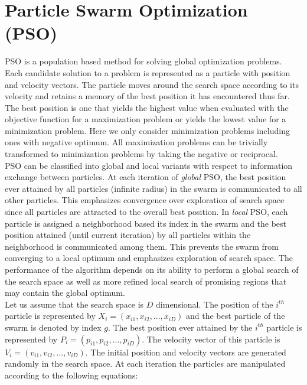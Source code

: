 \section{Particle Swarm Optimization (PSO)}

PSO is a population based method for solving global optimization problems. Each candidate solution to a problem is represented as a particle with position and velocity vectors. The particle moves around the search space according to its velocity and retains a memory of the best position it has encountered thus far. The best position is one that yields the highest value when evaluated with the objective function for a maximization problem or yields the lowest value for a minimization problem. Here we only consider minimization problems including ones with negative optimum. All maximization problems can be trivially transformed to minimization problems by taking the negative or reciprocal.\\

PSO can be classified into global and local variants with respect to information exchange between particles. At each iteration of {\it global} PSO, the best position ever attained by all particles (infinite radius) in the swarm is communicated to all other particles. This emphasizes convergence over exploration of search space since all particles are attracted to the overall best position. In {\it local} PSO, each particle is assigned a neighborhood based its index in the swarm and the best position attained (until current iteration) by all particles within the neighborhood is communicated among them. This prevents the swarm from converging to a local optimum and emphasizes exploration of search space. The performance of the algorithm depends on its ability to perform a global search of the search space as well as more refined local search of promising regions that may contain the global optimum.\\

Let us assume that the search space is $D$ dimensional. The position of the $i^{th}$ particle is represented by $X_{i} = (x_{i1},x_{i2},...,x_{iD})$ and the best particle of the swarm is denoted by index $g$. The best position ever attained by the $i^{th}$ particle is represented by $P_{i} = (p_{i1},p_{i2},...,p_{iD})$. The velocity vector of this particle is $V_{i} = (v_{i1},v_{i2},...,v_{iD})$. The initial position and velocity vectors are generated randomly in the search space. At each iteration the particles are manipulated according to the following equations:

